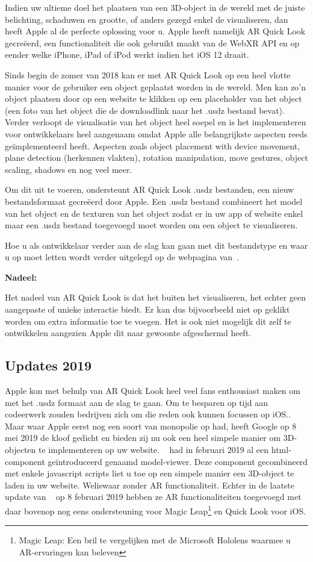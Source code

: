 Indien uw ultieme doel het plaatsen van een 3D-object in de wereld met de juiste belichting, schaduwen en grootte, of anders gezegd enkel de visualiseren, dan heeft Apple al de perfecte oplossing voor u. Apple heeft namelijk AR Quick Look gecreëerd, een functionaliteit die ook gebruikt maakt van de WebXR API en op eender welke iPhone, iPad of iPod werkt indien het iOS 12 draait. 

Sinds begin de zomer van 2018 kan er met AR Quick Look op een heel vlotte manier voor de gebruiker een object geplaatst worden in de wereld. Men kan zo'n object plaatsen door op een website te klikken op een placeholder van het object (een foto van het object die de downloadlink naar het .usdz bestand bevat). Verder verloopt de visualisatie van het object heel soepel en is het implementeren voor ontwikkelaars heel aangenaam omdat Apple alle belangrijkste aspecten reeds geïmplementeerd heeft. Aspecten zoals object placement with device movement, plane detection (herkennen vlakten), rotation manipulation, move gestures, object scaling, shadows en nog veel meer. 

Om dit uit te voeren, ondersteunt AR Quick Look .usdz bestanden, een nieuw bestandsformaat gecreëerd door Apple. Een .usdz bestand combineert het model van het object en de texturen van het object zodat er in uw app of website enkel maar een .usdz bestand toegevoegd moet worden om een object te visualiseren. 

Hoe u als ontwikkelaar verder aan de slag kan gaan met dit bestandstype en waar u op moet letten wordt verder uitgelegd op de webpagina van~\textcite{Apple2018}.

\textbf{Nadeel:}

Het nadeel van AR Quick Look is dat het buiten het visualiseren, het echter geen aangepaste of unieke interactie biedt. Er kan dus bijvoorbeeld niet op geklikt worden om extra informatie toe te voegen. Het is ook niet mogelijk dit zelf te ontwikkelen aangezien Apple dit naar gewoonte afgeschermd heeft. 

\subsection{Updates 2019}
Apple kon met behulp van AR Quick Look heel veel fans enthousiast maken om met het .usdz formaat aan de slag te gaan. Om te besparen op tijd aan codeerwerk zouden bedrijven zich om die reden ook kunnen focussen op iOS.. Maar waar Apple eerst nog een soort van monopolie op had, heeft Google op 8 mei 2019 de kloof gedicht en bieden zij nu ook een heel simpele manier om 3D-objecten te implementeren op uw website. ~\textcite{Medley2019} had in februari 2019 al een html-component geïntroduceerd genaamd model-viewer. Deze component gecombineerd met enkele javascript scripts liet u toe op een simpele manier een 3D-object te laden in uw website. Weliswaar zonder AR functionaliteit. Echter in de laatste update van ~\textcite{Google2019} op 8 februari 2019 hebben ze AR  functionaliteiten toegevoegd met daar bovenop nog eens ondersteuning voor Magic Leap\footnote{Magic Leap: Een bril te vergelijken met de Microsoft Hololens waarmee u AR-ervaringen kan beleven} en Quick Look voor iOS. 


